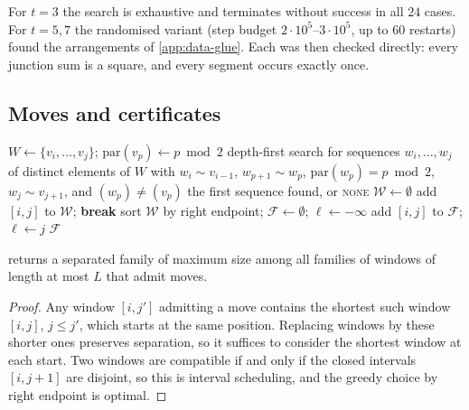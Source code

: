 For $t=3$ the search is exhaustive and terminates without success in all $24$ cases. For
$t=5,7$ the randomised variant (step budget $2\cdot10^5$--$3\cdot10^5$, up to $60$ restarts)
found the arrangements of \cref{app:data-glue}. Each was then checked directly: every
junction sum is a square, and every segment occurs exactly once.

\subsection{Moves and certificates}

\begin{algorithm}[h]
\caption{Parity-preserving moves of a path $P=(v_1,\dots,v_N)$}\label{alg:moves}
\begin{algorithmic}[1]
 
  \State $W\gets\{v_i,\dots,v_j\}$; $\mathrm{par}(v_p)\gets p\bmod 2$
  \State depth-first search for sequences $w_i,\dots,w_j$ of distinct elements of $W$ with
  \State \hspace{1.2em} $w_i\sim v_{i-1}$, $w_{p+1}\sim w_p$, $\mathrm{par}(w_p)=p\bmod 2$, $w_j\sim v_{j+1}$, and $(w_p)\ne(v_p)$
  \State \Return the first sequence found, or \textsc{none}
\EndFunction
\State $\mathcal W\gets\emptyset$
   
     add $[i,j]$ to $\mathcal W$; \textbf{break} \EndIf
  \EndFor
\EndFor
\State sort $\mathcal W$ by right endpoint; $\mathcal F\gets\emptyset$; $\ell\gets-\infty$
   add $[i,j]$ to $\mathcal F$; $\ell\gets j$ \EndIf
\EndFor
\State \Return $\mathcal F$ 
\end{algorithmic}
\end{algorithm}

\begin{lemma}
 returns a separated family of maximum size among all families of windows of
length at most $L$ that admit moves.
\end{lemma}
\begin{proof}
Any window $[i,j']$ admitting a move contains the shortest such window $[i,j]$, $j\le j'$, which
starts at the same position. Replacing windows by these shorter ones preserves separation, so
it suffices to consider the shortest window at each start. Two windows are compatible if and only
if the closed intervals $[i,j+1]$ are disjoint, so this is interval scheduling, and the greedy
choice by right endpoint is optimal.
\end{proof}

